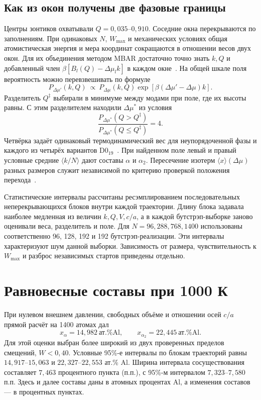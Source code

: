 \documentclass[11pt,a4paper]{article}
\begin{document}
\subsection{Как из окон получены две фазовые границы}
Центры зонтиков охватывали \(Q=0{,}035\)--\(0{,}910\).
Соседние окна перекрываются по заполнениям. При одинаковых \(N\),
\(W_{\max}\) и механических условиях общая атомистическая энергия и
мера координат сокращаются в отношении весов двух окон. Для их объединения
методом MBAR достаточно точно знать \(k,Q\) и добавленный член
\(\beta[B_l(Q)-\Delta\mu_l k]\) в каждом окне~\cite{mbar2008}.
На общей шкале поля вероятность можно перевзвешивать по формуле
\[
 P_{\Delta\mu'}(k,Q)\ \propto\ P_{\Delta\mu}(k,Q)
                       \exp[\beta(\Delta\mu'-\Delta\mu)k] .
\]
Разделитель \(Q^\ddagger\) выбирали в минимуме между модами
при поле, где их высоты равны. С этим разделителем находили \(\Delta\mu^*\)
из условия
\[
 \frac{P_{\Delta\mu^*}(Q>Q^\ddagger)}
      {P_{\Delta\mu^*}(Q\le Q^\ddagger)}=4 .
\]
Четвёрка задаёт одинаковый термодинамический вес для неупорядоченной фазы
и каждого из четырёх вариантов D0$_{19}$~\cite{janke1993}.
При найденном поле левый и правый условные средние \(\langle k/N\rangle\)
дают составы \(\alpha\) и \(\alpha_2\). Пересечение изотерм
\(\langle x\rangle(\Delta\mu)\) разных размеров служит независимой по
критерию проверкой положения перехода~\cite{borgs1992}.

Статистические интервалы рассчитаны ресэмплированием последовательных
неперекрывающихся блоков внутри каждой траектории. Длину блока задавала
наиболее медленная из величин \(k,Q,V,c/a\), а в каждой бутстрэп-выборке
заново оценивали веса, разделитель и поле. Для \(N=96,288,768,1400\)
использованы соответственно 96, 128, 192 и 192 бутстрэп-реализации.
Эти интервалы характеризуют шум данной выборки. Зависимость от размера,
чувствительность к \(W_{\max}\) и разброс независимых стартов
приведены отдельно.

\section{Равновесные составы при 1000 К}
\label{sec:bulk-results}

При нулевом внешнем давлении, свободных объёме и отношении осей
$c/a$ прямой расчёт на 1400 атомах дал
\[
 x_{\alpha}=14{,}982\ \text{ат.\% Al}, \qquad
 x_{\alpha_2}=22{,}445\ \text{ат.\% Al}.
\]
Для этой оценки выбран более широкий из двух проверенных пределов
смещений, $W<0{,}40$. Условные 95\%-е интервалы по блокам траекторий
равны $14{,}917$--$15{,}063$ и $22{,}327$--$22{,}553$ ат.\% Al.
Ширина интервала сосуществования составляет $7{,}463$ процентного
пункта (п.п.), с 95\%-м интервалом $7{,}323$--$7{,}580$ п.п.
Здесь и далее составы даны в атомных процентах Al, а изменения
составов --- в процентных пунктах.
\end{document}
